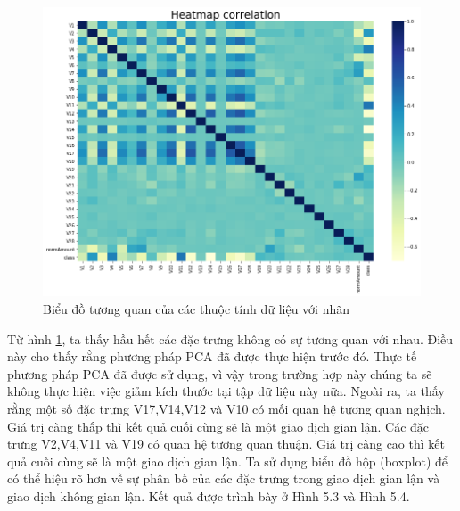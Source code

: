 \documentclass[a4paper, 12pt, oneside]{report}
\begin{document}
\begin{center}
    \begin{figure}[H]
    \begin{center}
     \includegraphics[scale=0.3]{correlation_creditcard_fraud.png}
    \end{center}
    \caption{Biểu đồ tương quan của các thuộc tính dữ liệu với nhãn}
    \label{Hình 5.2}
    \end{figure}
\end{center}
Từ hình \ref{Hình 5.2}, ta thấy hầu hết các đặc trưng không có sự tương quan với nhau. Điều này cho thấy rằng phương pháp PCA đã được thực hiện trước đó. Thực tế phương pháp PCA đã được sử dụng, vì vậy trong trường hợp này chúng ta sẽ không thực hiện việc giảm kích thước tại tập dữ liệu này nữa. Ngoài ra, ta thấy rằng một số đặc trưng V17,V14,V12 và V10 có mối quan hệ tương quan nghịch. Giá trị càng thấp thì kết quả cuối cùng sẽ là một giao dịch gian lận. Các đặc trưng V2,V4,V11 và V19 có quan hệ tương quan thuận. Giá trị càng cao thì kết quả cuối cùng sẽ là một giao dịch gian lận. Ta sử dụng biểu đồ hộp (boxplot) để có thể hiệu rõ hơn về sự phân bố của các đặc trưng trong giao dịch gian lận và giao dịch không gian lận. Kết quả được trình bày ở Hình 5.3  và Hình 5.4.
\end{document}
